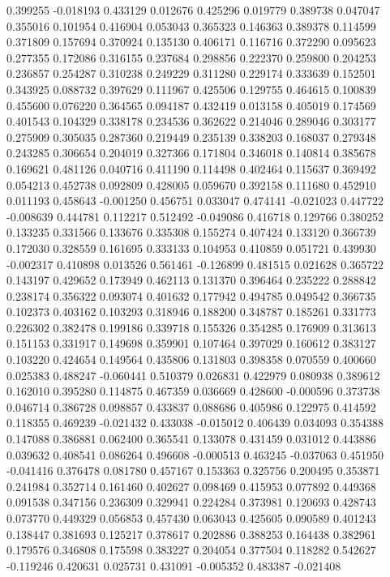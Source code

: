 0.399255
-0.018193
0.433129
0.012676
0.425296
0.019779
0.389738
0.047047
0.355016
0.101954
0.416904
0.053043
0.365323
0.146363
0.389378
0.114599
0.371809
0.157694
0.370924
0.135130
0.406171
0.116716
0.372290
0.095623
0.277355
0.172086
0.316155
0.237684
0.298856
0.222370
0.259800
0.204253
0.236857
0.254287
0.310238
0.249229
0.311280
0.229174
0.333639
0.152501
0.343925
0.088732
0.397629
0.111967
0.425506
0.129755
0.464615
0.100839
0.455600
0.076220
0.364565
0.094187
0.432419
0.013158
0.405019
0.174569
0.401543
0.104329
0.338178
0.234536
0.362622
0.214046
0.289046
0.303177
0.275909
0.305035
0.287360
0.219449
0.235139
0.338203
0.168037
0.279348
0.243285
0.306654
0.204019
0.327366
0.171804
0.346018
0.140814
0.385678
0.169621
0.481126
0.040716
0.411190
0.114498
0.402464
0.115637
0.369492
0.054213
0.452738
0.092809
0.428005
0.059670
0.392158
0.111680
0.452910
0.011193
0.458643
-0.001250
0.456751
0.033047
0.474141
-0.021023
0.447722
-0.008639
0.444781
0.112217
0.512492
-0.049086
0.416718
0.129766
0.380252
0.133235
0.331566
0.133676
0.335308
0.155274
0.407424
0.133120
0.366739
0.172030
0.328559
0.161695
0.333133
0.104953
0.410859
0.051721
0.439930
-0.002317
0.410898
0.013526
0.561461
-0.126899
0.481515
0.021628
0.365722
0.143197
0.429652
0.173949
0.462113
0.131370
0.396464
0.235222
0.288842
0.238174
0.356322
0.093074
0.401632
0.177942
0.494785
0.049542
0.366735
0.102373
0.403162
0.103293
0.318946
0.188200
0.348787
0.185261
0.331773
0.226302
0.382478
0.199186
0.339718
0.155326
0.354285
0.176909
0.313613
0.151153
0.331917
0.149698
0.359901
0.107464
0.397029
0.160612
0.383127
0.103220
0.424654
0.149564
0.435806
0.131803
0.398358
0.070559
0.400660
0.025383
0.488247
-0.060441
0.510379
0.026831
0.422979
0.080938
0.389612
0.162010
0.395280
0.114875
0.467359
0.036669
0.428600
-0.000596
0.373738
0.046714
0.386728
0.098857
0.433837
0.088686
0.405986
0.122975
0.414592
0.118355
0.469239
-0.021432
0.433038
-0.015012
0.406439
0.034093
0.354388
0.147088
0.386881
0.062400
0.365541
0.133078
0.431459
0.031012
0.443886
0.039632
0.408541
0.086264
0.496608
-0.000513
0.463245
-0.037063
0.451950
-0.041416
0.376478
0.081780
0.457167
0.153363
0.325756
0.200495
0.353871
0.241984
0.352714
0.161460
0.402627
0.098469
0.415953
0.077892
0.449368
0.091538
0.347156
0.236309
0.329941
0.224284
0.373981
0.120693
0.428743
0.073770
0.449329
0.056853
0.457430
0.063043
0.425605
0.090589
0.401243
0.138447
0.381693
0.125217
0.378617
0.202886
0.388253
0.164438
0.382961
0.179576
0.346808
0.175598
0.383227
0.204054
0.377504
0.118282
0.542627
-0.119246
0.420631
0.025731
0.431091
-0.005352
0.483387
-0.021408
